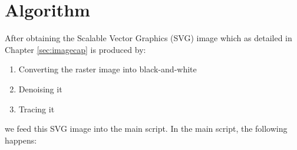 \documentclass{dalthesis}
\begin{document}
\chapter{Algorithm}\label{sec:algorithm}

After obtaining the Scalable Vector Graphics (SVG) image which as detailed in Chapter \ref{sec:imagecap} is produced by:

\begin{enumerate}
  \item Converting the raster image into black-and-white
  \item Denoising it
  \item Tracing it
\end{enumerate}

\noindent
we feed this SVG image into the main script. In the main script, the following happens:
\end{document}
